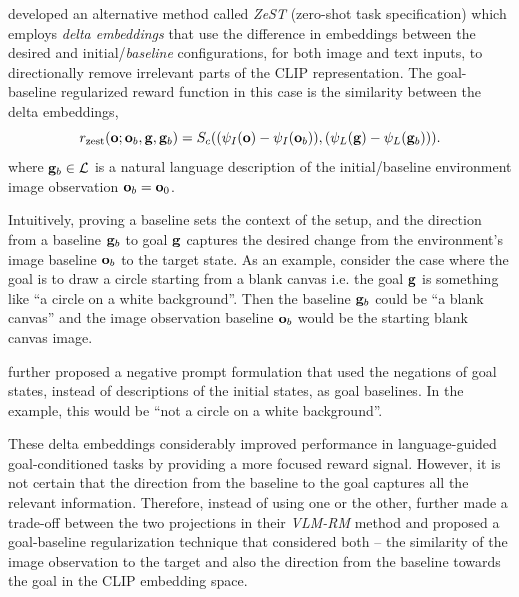 \cite{zest} developed an alternative method called \emph{ZeST} (zero-shot task specification) which employs \emph{delta embeddings} that use the difference in embeddings between the desired and initial/\emph{baseline} configurations, for both image and text inputs, to directionally remove irrelevant parts of the CLIP representation.
The goal-baseline regularized reward function in this case is the similarity between the delta embeddings,
\begin{equation}
    \label{eq:zest}
    r_{\text{zest}}(\mathbf{o}; \mathbf{o}_b, \mathbf{g}, \mathbf{g}_b) = S_c((\psi_I(\mathbf{o}) - \psi_I(\mathbf{o}_b)), (\psi_L(\mathbf{g}) - \psi_L(\mathbf{g}_b))).
\end{equation}
where \(\mathbf{g}_b \in \mathcal{L}\) is a natural language description of the initial/baseline environment image observation \(\mathbf{o}_b = \mathbf{o}_0\).

Intuitively, proving a baseline sets the context of the setup, and the direction from a baseline \(\mathbf{g}_b\) to goal \(\mathbf{g}\) captures the desired change from the environment's image baseline \(\mathbf{o}_b\) to the target state.
As an example, consider the case where the goal is to draw a circle starting from a blank canvas i.e. the goal \(\mathbf{g}\) is something like ``a circle on a white background''.
Then the baseline \(\mathbf{g}_b\) could be ``a blank canvas'' and the image observation baseline \(\mathbf{o}_b\) would be the starting blank canvas image.

\cite{negprompt} further proposed a negative prompt formulation that used the negations of goal states, instead of descriptions of the initial states, as goal baselines.
In the example, this would be ``not a circle on a white background''.

These delta embeddings considerably improved performance in language-guided goal-conditioned tasks by providing a more focused reward signal.
However, it is not certain that the direction from the baseline to the goal captures all the relevant information.
Therefore, instead of using one or the other, \cite{vlmrm} further made a trade-off between the two projections in their \emph{VLM-RM} method and proposed a goal-baseline regularization technique that considered both -- the similarity of the image observation to the target and also the direction from the baseline towards the goal in the CLIP embedding space.

